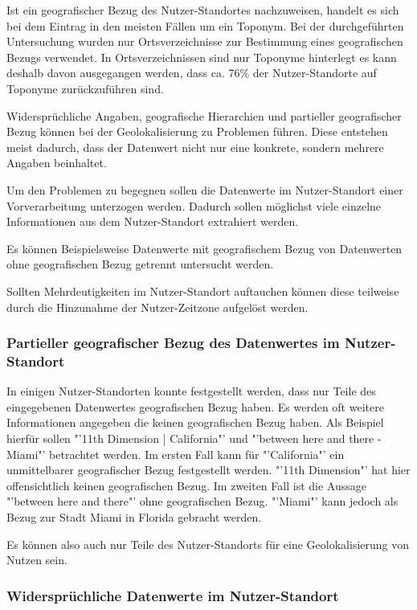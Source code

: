				Ist ein geografischer Bezug des Nutzer-Standortes nachzuweisen, handelt es sich bei dem Eintrag in den meisten Fällen um ein Toponym.
				Bei der durchgeführten Untersuchung wurden nur Ortsverzeichnisse zur Bestimmung eines geografischen Bezugs verwendet.
				In Ortsverzeichnissen sind nur Toponyme hinterlegt es kann deshalb davon ausgegangen werden, dass ca. 76\% der Nutzer-Standorte auf Toponyme zurückzuführen sind.

				Widersprüchliche Angaben, geografische Hierarchien und partieller geografischer Bezug können bei der Geolokalisierung zu Problemen führen.
				Diese entstehen meist dadurch, dass der Datenwert nicht nur eine konkrete, sondern mehrere Angaben beinhaltet.
				
				Um den Problemen zu begegnen sollen die Datenwerte im Nutzer-Standort einer Vorverarbeitung unterzogen werden. 
				Dadurch sollen möglichst viele einzelne Informationen aus dem Nutzer-Standort extrahiert werden.

				Es können Beispielsweise Datenwerte mit geografischem Bezug von Datenwerten ohne geografischen Bezug getrennt untersucht werden.

				Sollten Mehrdeutigkeiten im Nutzer-Standort auftauchen können diese teilweise durch die Hinzunahme der Nutzer-Zeitzone aufgelöst werden.

			\subsubsection{Partieller geografischer Bezug des Datenwertes im Nutzer-Standort} \label{subsec:partiellerGeografischerBezug} 

				In einigen Nutzer-Standorten konnte festgestellt werden, dass nur Teile des eingegebenen Datenwertes geografischen Bezug haben. 
				Es werden oft weitere Informationen angegeben die keinen geografischen Bezug haben. 
				Als Beispiel hierfür sollen "'11th Dimension | California"' und "'between here and there - Miami"' betrachtet werden.
				Im ersten Fall kann für "'California"' ein unmittelbarer geografischer Bezug festgestellt werden.
				"'11th Dimension"' hat hier offensichtlich keinen geografischen Bezug.
				Im zweiten Fall ist die Aussage "'between here and there"' ohne geografischen Bezug.
				"'Miami"' kann jedoch als Bezug zur Stadt Miami in Florida gebracht werden.
				
				Es können also auch nur Teile des Nutzer-Standorts für eine Geolokalisierung von Nutzen sein.

			\subsubsection{Widersprüchliche Datenwerte im Nutzer-Standort} \label{subsec:wiederspruechlicheBezuege} 

